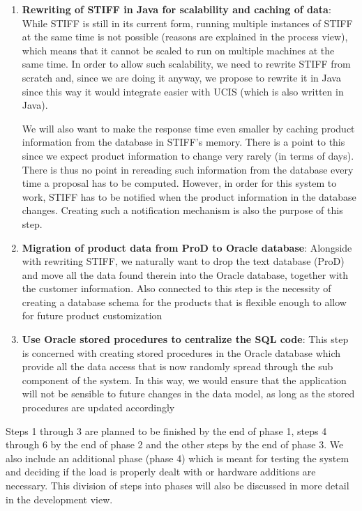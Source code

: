 \begin{enumerate}
\item \textbf{Rewriting of STIFF in Java for scalability and caching of data}: While
STIFF is still in its current form, running multiple instances of STIFF at the
same time is not possible (reasons are explained in the process view),
which means that it cannot be scaled to run on multiple machines at the
same time. In order to allow such scalability, we need to rewrite STIFF
from scratch and, since we are doing it anyway, we propose to rewrite it
in Java since this way it would integrate easier with UCIS (which is also
written in Java).

We will also want to make the response time even smaller by caching
product information from the database in STIFF's memory. There is a point
to this since we expect product information to change very rarely (in terms of
days). There is thus no point in rereading such information from the
database every time a proposal has to be computed. However, in order
for this system to work, STIFF has to be notified when the product
information in the database changes. Creating such a notification
mechanism is also the purpose of this step.

\item \textbf{Migration of product data from ProD to Oracle database}: Alongside
with rewriting STIFF, we naturally want to drop the text database (ProD)
and move all the data found therein into the Oracle database, together
with the customer information. Also connected to this step is the necessity
of creating a database schema for the products that is flexible enough
to allow for future product customization

\item \textbf{Use Oracle stored procedures to centralize the SQL code}: This step is
concerned with creating stored procedures in the Oracle database which
provide all the data access that is now randomly spread through the
sub component of the system. In this way, we would ensure that the
application will not be sensible to future changes in the data model,
as long as the stored procedures are updated accordingly

\end{enumerate}

Steps 1 through 3 are planned to be finished by the end of phase 1, steps 4
through 6 by the end of phase 2 and the other steps by the end of phase 3. We
also include an additional phase (phase 4) which is meant for testing the system
and deciding if the load is properly dealt with or hardware additions are
necessary. This division of steps into phases will also be discussed in more
detail in the development view.

